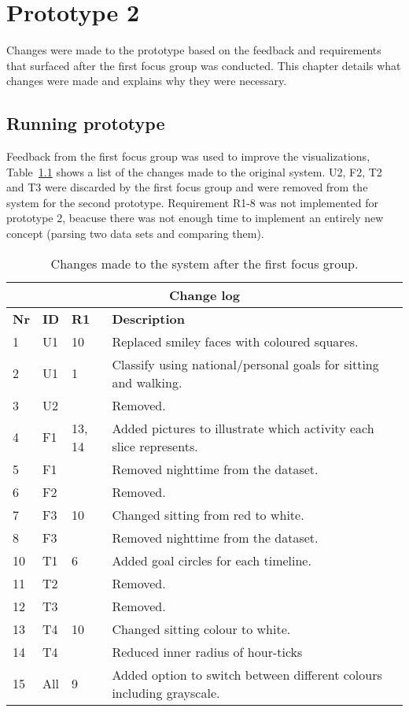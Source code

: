 \chapter{Prototype 2}
\label{ch:prototype2}
Changes were made to the prototype based on the feedback and requirements that surfaced after the first focus group was conducted. This chapter details what changes were made and explains why they were necessary.

\section{Running prototype}
\label{sec:runningPrototype2}
Feedback from the first focus group was used to improve the visualizations, Table~\ref{fig:changeLog} shows a list of the changes made to the original system. U2, F2, T2 and T3 were discarded by the first focus group and were removed from the system for the second prototype. Requirement R1-8 was not implemented for prototype 2, beacuse there was not enough time to implement an entirely new concept (parsing two data sets and comparing them).

\begin{table}[h!]
  \centering
  \begin{tabular}{|l|l|l|p{8cm}|}
      \multicolumn{4}{c}{\textbf{Change log}} \\ \hline
      \textbf{Nr} & \textbf{ID} & \textbf{R1} & \textbf{Description} \\ \hline
      1  & U1  & 10       & Replaced smiley faces with coloured squares. \\ \hline
      2  & U1  & 1        & Classify using national/personal goals for sitting and walking.\\ \hline 
      3  & U2  &          & Removed. \\ \hline
      4  & F1  & 13, 14   & Added pictures to illustrate which activity each slice represents. \\ \hline
      5  & F1  &          & Removed nighttime from the dataset. \\ \hline
      6  & F2  &          & Removed. \\ \hline 
      7  & F3  & 10       & Changed sitting from red to white. \\ \hline
      8  & F3  &          & Removed nighttime from the dataset. \\ \hline
      10 & T1  & 6        & Added goal circles for each timeline. \\ \hline
      11 & T2  &          & Removed. \\ \hline
      12 & T3  &          & Removed. \\ \hline
      13 & T4  & 10       & Changed sitting colour to white. \\ \hline
      14 & T4  &          & Reduced inner radius of hour-ticks \\ \hline
      15 & All & 9        & Added option to switch between different colours including grayscale. \\ \hline
  \end{tabular}
  \caption{Changes made to the system after the first focus group.}
  \label{fig:changeLog}
\end{table}

